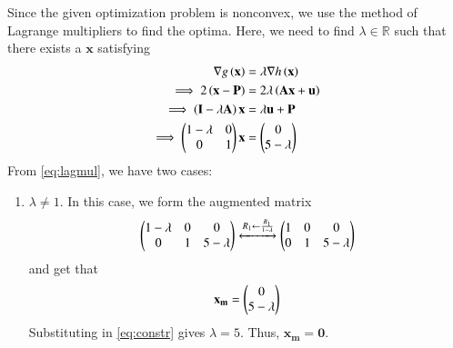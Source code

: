 \documentclass[journal,12pt,twocolumn]{IEEEtran}
\renewcommand{\vec}[1]{\boldsymbol{\mathbf{#1}}}
\begin{document}
\begin{enumerate}
    Since the given optimization problem is nonconvex, we use the method of 
    Lagrange multipliers to find the optima. Here, we need to find 
    $\lambda \in \mathbb{R}$ such that there exists a $\vec{x}$ 
    satisfying
    \begin{align}
        \nabla g\brak{\vec{x}} &= \lambda\nabla h\brak{\vec{x}} \\
        \implies 2\brak{\vec{x}-\vec{P}} &= 2\lambda\brak{\vec{Ax}+\vec{u}} \\
        \implies \brak{\vec{I}-\lambda\vec{A}}\vec{x} &= \lambda\vec{u} + \vec{P} \\
        \implies \myvec{1-\lambda&0\\0&1}\vec{x} &= \myvec{0\\5-\lambda}
        \label{eq:lagmul}
    \end{align}
    From \eqref{eq:lagmul}, we have two cases:
    \begin{enumerate}
        \item $\lambda \neq 1$. In this case, we form the augmented matrix
        \begin{align}
            \begin{pmatrix}1-\lambda&0&0\\0&1&5-\lambda\end{pmatrix} \xleftrightarrow[]{R_1 \leftarrow \frac{R_1}{1-\lambda}} \begin{pmatrix}1&0&0\\0&1&5-\lambda\end{pmatrix}
        \end{align}
        and get that
        \begin{align}
            \vec{x_m} = \myvec{0\\5-\lambda}
        \end{align}
        Substituting in \eqref{eq:constr} gives $\lambda = 5$. Thus, 
        $\vec{x_m} = \vec{0}$.


\end{enumerate}
\end{enumerate}
\end{document}
